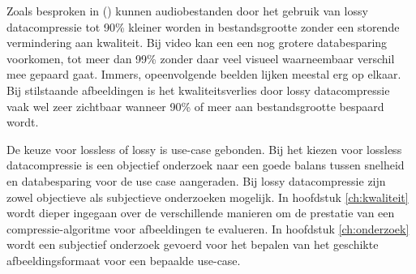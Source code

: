 Zoals besproken in  (\cite{kaur2016}) kunnen audiobestanden door het gebruik van \gls{lossy} \gls{datacompressie} tot 90\% kleiner worden in bestandsgrootte zonder een storende vermindering aan kwaliteit. Bij video kan een een nog grotere databesparing voorkomen, tot meer dan 99\% zonder daar veel visueel waarneembaar verschil mee gepaard gaat. Immers, opeenvolgende beelden lijken meestal erg op elkaar. Bij stilstaande afbeeldingen is het kwaliteitsverlies door \gls{lossy} \gls{datacompressie} vaak wel zeer zichtbaar wanneer 90\% of meer aan bestandsgrootte bespaard wordt.

De keuze voor \gls{lossless} of \gls{lossy} is \gls{use-case} gebonden. Bij het kiezen voor \gls{lossless} \gls{datacompressie} is een objectief onderzoek naar een goede balans tussen snelheid en databesparing voor de use case aangeraden. Bij \gls{lossy} \gls{datacompressie} zijn zowel objectieve als subjectieve onderzoeken mogelijk. In hoofdstuk \ref{ch:kwaliteit} wordt dieper ingegaan over de verschillende manieren om de prestatie van een \gls{compressie-algoritme} voor afbeeldingen te evalueren. In hoofdstuk \ref{ch:onderzoek} wordt een subjectief onderzoek gevoerd voor het bepalen van het geschikte \gls{afbeeldingsformaat} voor een bepaalde \gls{use-case}.


